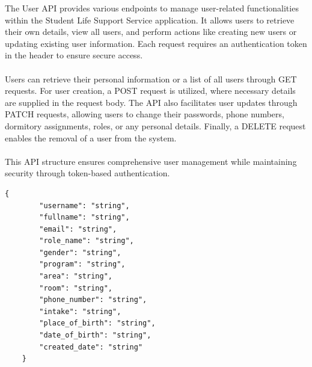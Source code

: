 The User API provides various endpoints to manage user-related functionalities within the Student Life Support Service application. It allows users to retrieve their own details, view all users, and perform actions like creating new users or updating existing user information. Each request requires an authentication token in the header to ensure secure access. \\ \\
Users can retrieve their personal information or a list of all users through GET requests. For user creation, a POST request is utilized, where necessary details are supplied in the request body. The API also facilitates user updates through PATCH requests, allowing users to change their passwords, phone numbers, dormitory assignments, roles, or any personal details. Finally, a DELETE request enables the removal of a user from the system. \\ \\
This API structure ensures comprehensive user management while maintaining security through token-based authentication.

\begin{lstlisting}[breaklines=true, caption=User Schema]
	{
		"username": "string",
		"fullname": "string",
		"email": "string",
		"role_name": "string",
		"gender": "string",
		"program": "string",
		"area": "string",
		"room": "string",
		"phone_number": "string",
		"intake": "string",
		"place_of_birth": "string",
		"date_of_birth": "string",
		"created_date": "string"
	}
\end{lstlisting}



%


